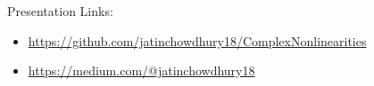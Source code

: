 \begin{frame}{Presentation}
    Links:
    \begin{itemize}
        \item \url{https://github.com/jatinchowdhury18/ComplexNonlinearities}
        \item \url{https://medium.com/@jatinchowdhury18}
    \end{itemize}
\end{frame}

\begin{frame}{}
\end{frame}


